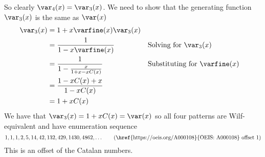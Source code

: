 So clearly \(\var_4(x) = \var_3(x)\).
We need to show that the generating function \(\var_3(x)\) is the same as \(\var(x)\)
\begin{equation*}
    \begin{aligned}
        \var_3(x) &= 1 + x\varfine(x)\var_3(x) \\
        &= \frac{1}{1-x\varfine(x)} && \text{Solving for \(\var_3(x)\)}\\
        &= \frac{1}{1 - \frac{x}{1+x-xC(x)}} &&\text{Substituting for \(\varfine(x)\)}\\
        &= \frac{1-xC(x) +x}{1-xC(x)}\\
        &= 1+xC(x)
    \end{aligned}
\end{equation*}
We have that \(\var_3(x) = 1+xC(x)= \var(x) \) so all four patterns are Wilf-equivalent
 and have enumeration sequence
 \begin{equation*}
     1, 1, 1, 2, 5, 14, 42, 132, 429, 1430, 4862,\dotsc \tag{\href{https://oeis.org/A000108}{OEIS: A000108} offset 1}
 \end{equation*}
 This is an offset of the Catalan numbers.

